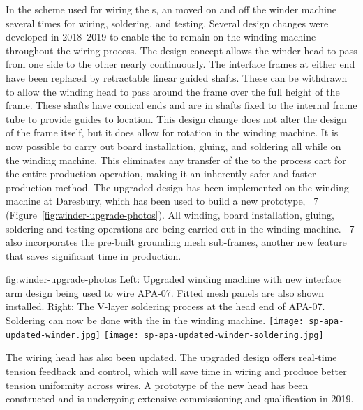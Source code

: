 In the scheme used for wiring the  s, an  moved on and off the winder machine several times for wiring, soldering, and testing. %
 Several design changes were developed in 2018--2019 to enable the  to remain on the winding machine throughout the wiring process. The design concept allows the winder head to pass from one side to the other nearly continuously. The interface frames at either end have been replaced by retractable linear guided shafts. These can be withdrawn to allow the winding head to pass around the frame over the full height of the frame. These shafts have conical ends and are in shafts fixed to the internal frame tube to provide guides to location. This design change does not alter the design of the frame itself, but it does allow for rotation in the winding machine. It is now possible to carry out board installation, gluing, and soldering all while on the winding machine. This eliminates any transfer of the  to the process cart for the entire production operation, making it an inherently safer and faster production method.%
 The upgraded design has been implemented on the winding machine at Daresbury, which has been used to build a new prototype, ~7 (Figure~\ref{fig:winder-upgrade-photos}). All winding, board installation, gluing, soldering and testing operations are being carried out in the winding machine. ~7 also incorporates the pre-built grounding mesh sub-frames, another new feature %
 that saves significant time in production.  

\begin{dunefigure}{fig:winder-upgrade-photos}
{Left: Upgraded winding machine with new interface arm design being used to wire APA-07. Fitted mesh panels are also shown installed. Right: The V-layer soldering process at the head end of APA-07. Soldering can now be done with the  in the winding machine.}
\texttt{[image: sp-apa-updated-winder.jpg]} 
\texttt{[image: sp-apa-updated-winder-soldering.jpg]}
\end{dunefigure}

The wiring head has also been updated. The upgraded design offers real-time tension feedback and control, which will save time in wiring and produce better tension uniformity across wires.  A prototype of the new head has been constructed and is undergoing extensive commissioning and qualification in 2019.   %

